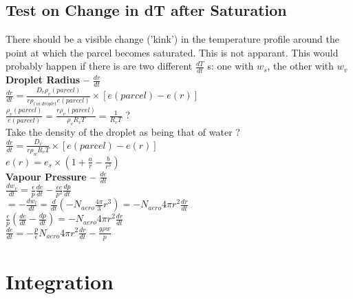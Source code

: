 \documentclass[11pt]{article} %
\begin{document}
\subsection{Test on Change in dT after Saturation}

There should be a visible change ('kink') in the temperature profile around the point at which the parcel becomes saturated.  This is not apparant.  This would probably happen if there is are two different $\frac{dT}{dt}$ s: one with $w_{s}$, the other with $w_{v}$\\

{\bf Droplet Radius -- $\frac{dr}{dt}$} \\

$\frac{dr}{dt} = \frac{D_{v}\rho_{v}(parcel)}{r \rho_{l \ in \ droplet}e(parcel)} \times [e(parcel) - e(r)]$\\

$\frac{\rho_{v}(parcel)}{e(parcel)} = \frac{ r \rho_{v}(parcel)}{\rho_{v}R_{v}T} = \frac{1}{R_{v}T}$ ?\\

Take the density of the droplet as being that of water ?\\

$\frac{dr}{dt} = \frac{D_{v}}{r \rho_{w}R_{v}T} \times [e(parcel) - e(r)]$\\

$e(r) = e_{s} \times \left(1 + \frac{a}{r} - \frac{b}{r^{3}} \right) $\\

{\bf Vapour Pressure -- $\frac{de}{dt}$}\\

$\frac{dw_{v}}{dt} = \frac{\epsilon}{p} \frac{de}{dt} - \frac{\epsilon e}{p^{2}}\frac{dp}{dt}$\\

$ = - \frac{dw_{l}}{dt} = \frac{d}{dt} \left( -N_{aero} \frac{4 \pi}{3} r^{3} \right) = -N_{aero} 4 \pi r^{2} \frac{dr}{dt}$\\

$ \frac{\epsilon}{p} \left( \frac{de}{dt} - \frac{dp}{dt}\right) = -N_{aero} 4 \pi r^{2} \frac{dr}{dt}$\\

$\frac{de}{dt} = -\frac{p}{\epsilon} N_{aero} 4 \pi r^{2} \frac{dr}{dt} - \frac{g\rho w}{p}$\\

\section{Integration}
\end{document}

